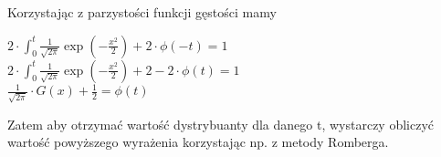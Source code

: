 \documentclass[a4paper]{scrartcl}
\begin{document}
Korzystając z parzystości funkcji gęstości mamy
\begin{center}
$2\cdot \int^{t}_{0} \frac{1}{\sqrt{2\pi}}\exp(-\frac{x^2}{2}) + 
2\cdot \phi(-t) = 1$\\
$2\cdot \int^{t}_{0} \frac{1}{\sqrt{2\pi}}\exp(-\frac{x^2}{2}) + 
2 - 2\cdot \phi(t) = 1$\\
$\frac{1}{\sqrt{2\pi}}\cdot G(x) + \frac{1}{2} = \phi(t)$
\end{center}
Zatem aby otrzymać wartość dystrybuanty dla danego t, wystarczy obliczyć wartość powyższego wyrażenia korzystając np. z metody Romberga.
\end{document}
